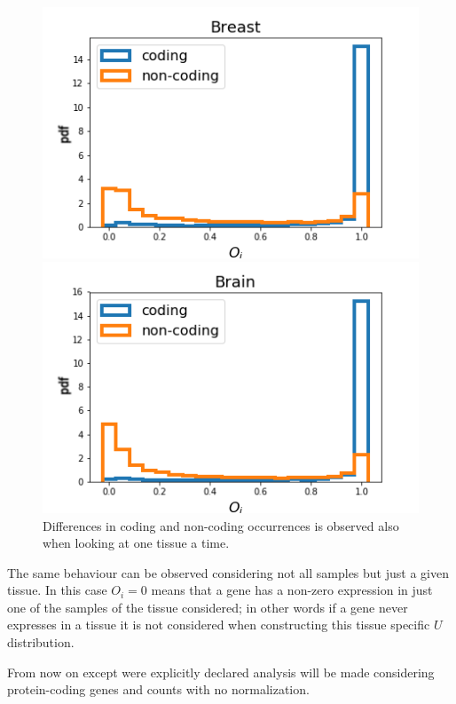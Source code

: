 \begin{figure}[htb!]
    \centering
    \begin{minipage}{0.45\textwidth}
    \includegraphics[width=0.95\linewidth]{pictures/structure/gtex/U_Breast.png}
    \end{minipage}
    \hspace{2mm}
    \begin{minipage}{0.45\textwidth}
    \includegraphics[width=0.95\linewidth]{pictures/structure/gtex/U_Brain.png}
    \end{minipage}
    \caption{Differences in coding and non-coding occurrences is observed also when looking at one tissue a time.}
    \label{fig:structure/gtex/U_tissues}
\end{figure}

The same behaviour can be observed considering not all samples but just a given tissue. In this case $O_i=0$ means that a gene has a non-zero expression in just one of the samples of the tissue considered; in other words if a gene never expresses in a tissue it is not considered when constructing this tissue specific $U$ distribution.

From now on except were explicitly declared analysis will be made considering protein-coding genes and counts with no normalization.